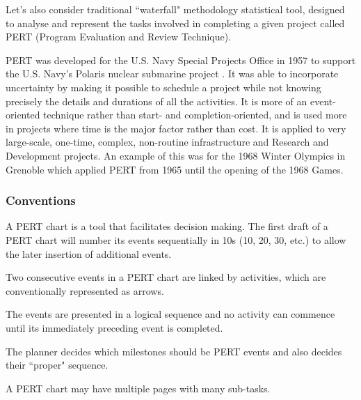 
Let's also consider traditional ``waterfall" methodology  statistical tool, designed to analyse and represent the tasks involved in completing a given project called PERT (Program Evaluation and Review Technique).

PERT was developed for the U.S. Navy Special Projects Office in 1957 to support the U.S. Navy's Polaris nuclear submarine project \cite{fazar}. It was able to incorporate uncertainty by making it possible to schedule a project while not knowing precisely the details and durations of all the activities. It is more of an event-oriented technique rather than start- and completion-oriented, and is used more in projects where time is the major factor rather than cost. It is applied to very large-scale, one-time, complex, non-routine infrastructure and Research and Development projects. An example of this was for the 1968 Winter Olympics in Grenoble which applied PERT from 1965 until the opening of the 1968 Games.

\subsubsection{Conventions}

\begin{compactitem}
\item A PERT chart is a tool that facilitates decision making. The first draft of a PERT chart will number its events sequentially in 10s (10, 20, 30, etc.) to allow the later insertion of additional events.
\item Two consecutive events in a PERT chart are linked by activities, which are conventionally represented as arrows.
\item The events are presented in a logical sequence and no activity can commence until its immediately preceding event is completed.
\item The planner decides which milestones should be PERT events and also decides their ``proper" sequence.
\item A PERT chart may have multiple pages with many sub-tasks.
\end{compactitem}

